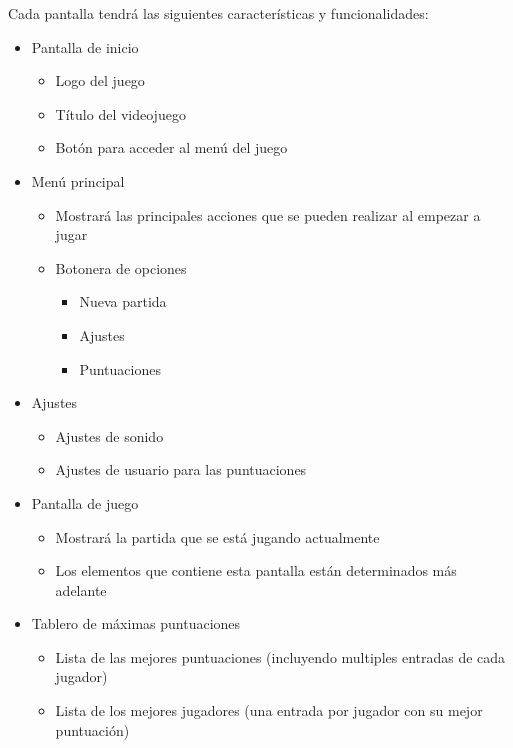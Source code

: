 \documentclass[palatino]{apuntes}
\begin{document}
Cada pantalla tendrá las siguientes características y funcionalidades:
\begin{itemize}
    \item Pantalla de inicio
        \begin{itemize}
            \item Logo del juego
            \item Título del videojuego
            \item Botón para acceder al menú del juego
        \end{itemize}
    \item Menú principal
        \begin{itemize}
            \item Mostrará las principales acciones que se pueden realizar al empezar a jugar
            \item Botonera de opciones
                \begin{itemize}
                    \item Nueva partida
                    \item Ajustes
                    \item Puntuaciones
                \end{itemize}
        \end{itemize}
    \item Ajustes
        \begin{itemize}
            \item Ajustes de sonido
            \item Ajustes de usuario para las puntuaciones
        \end{itemize}
    \item Pantalla de juego
        \begin{itemize}
            \item Mostrará la partida que se está jugando actualmente
            \item Los elementos que contiene esta pantalla están determinados más adelante
        \end{itemize}
    \item Tablero de máximas puntuaciones
        \begin{itemize}
            \item Lista de las mejores puntuaciones (incluyendo multiples entradas de cada jugador)
            \item Lista de los mejores jugadores (una entrada por jugador con su mejor puntuación)
        \end{itemize}
\end{itemize}
\end{document}
